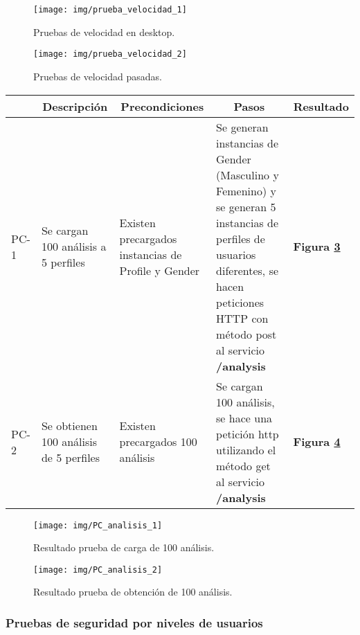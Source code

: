\newpage

    \begin{figure}[h]
    	\centering
    	\texttt{[image: img/prueba\_velocidad\_1]}
    	\caption{Pruebas de velocidad en desktop.}
    	\label{prueba_velocidad_1}
    \end{figure}

    \begin{figure}[h]
    	\centering
    	\texttt{[image: img/prueba\_velocidad\_2]}
    	\caption{Pruebas de velocidad pasadas.}
    	\label{prueba_velocidad_2}
    \end{figure}

\newpage

\begin{longtable}{|m{1cm}|m{3cm}|m{3cm}|m{3.5cm}|m{2.5cm}|}
	\hline \hline
		\rowcolor[gray]{0.9} 
		\multicolumn{1}{|c}{ID} & \multicolumn{1}{|c|}{Descripción} & \multicolumn{1}{c|}{Precondiciones} & \multicolumn{1}{c|}{Pasos} &
		\multicolumn{1}{c|}{Resultado} \\
	\hline
	PC-1 & Se cargan 100 análisis a 5 perfiles  & Existen precargados instancias de Profile y Gender & Se generan instancias de Gender (Masculino y Femenino) y se generan 5 instancias de perfiles de usuarios diferentes, se hacen peticiones HTTP con método post al servicio \textbf{/analysis} & \textbf{Figura \ref{pc_a_1}} \\
	\hline
	PC-2 & Se obtienen 100 análisis de 5 perfiles & Existen precargados 100 análisis & Se cargan 100 análisis, se hace una petición http utilizando el método get al servicio \textbf{/analysis} & \textbf{Figura \ref{pc_a_2}}\\
		\hline

\end{longtable}

\begin{figure}[h]
    \centering
    \texttt{[image: img/PC\_analisis\_1]}
    \caption{Resultado prueba de carga de 100 análisis.}
	\label{pc_a_1}
\end{figure}

\begin{figure}[h]
    \centering
    \texttt{[image: img/PC\_analisis\_2]}
    \caption{Resultado prueba de obtención de 100 análisis.}
	\label{pc_a_2}
\end{figure}
\clearpage

\subsubsection{Pruebas de seguridad por niveles de usuarios}

